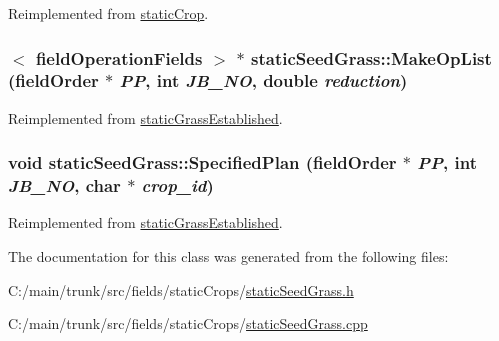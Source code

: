Reimplemented from \hyperlink{classstatic_crop_ab7b9a8ecb31b10c4dcf44f13000e2f8c}{staticCrop}.\hypertarget{classstatic_seed_grass_a33e78ba847a76de09f30b7eb4ff88a68}{
\subsubsection[{MakeOpList}]{$<$ {\bf fieldOperationFields} $>$ $\ast$ staticSeedGrass::MakeOpList ({\bf fieldOrder} $\ast$ {\em PP}, \/  int {\em JB\_\-NO}, \/  double {\em reduction})}}
\label{classstatic_seed_grass_a33e78ba847a76de09f30b7eb4ff88a68}


Reimplemented from \hyperlink{classstatic_grass_established_a65912caac93f0e92f34542f28585c5ce}{staticGrassEstablished}.\hypertarget{classstatic_seed_grass_a816b9db700be83fb80b143e80c63286e}{
\subsubsection[{SpecifiedPlan}]{\setlength{\rightskip}{0pt plus 5cm}void staticSeedGrass::SpecifiedPlan ({\bf fieldOrder} $\ast$ {\em PP}, \/  int {\em JB\_\-NO}, \/  char $\ast$ {\em crop\_\-id})}}
\label{classstatic_seed_grass_a816b9db700be83fb80b143e80c63286e}


Reimplemented from \hyperlink{classstatic_grass_established_af5cde9b824bca1b7ffef27ecb92d4b8b}{staticGrassEstablished}.

The documentation for this class was generated from the following files:\begin{DoxyCompactItemize}
\item 
C:/main/trunk/src/fields/staticCrops/\hyperlink{static_seed_grass_8h}{staticSeedGrass.h}\item 
C:/main/trunk/src/fields/staticCrops/\hyperlink{static_seed_grass_8cpp}{staticSeedGrass.cpp}\end{DoxyCompactItemize}
